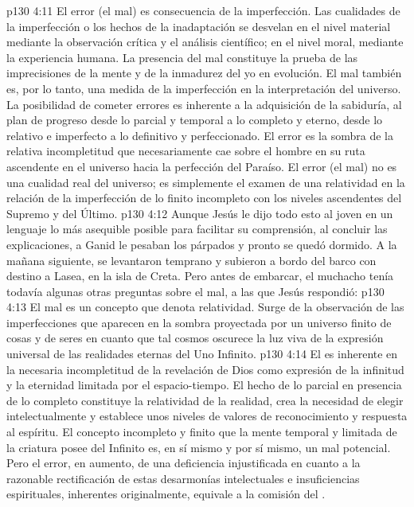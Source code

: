 \vs p130 4:11 El error (el mal) es consecuencia de la imperfección. Las cualidades de la imperfección o los hechos de la inadaptación se desvelan en el nivel material mediante la observación crítica y el análisis científico; en el nivel moral, mediante la experiencia humana. La presencia del mal constituye la prueba de las imprecisiones de la mente y de la inmadurez del yo en evolución. El mal también es, por lo tanto, una medida de la imperfección en la interpretación del universo. La posibilidad de cometer errores es inherente a la adquisición de la sabiduría, al plan de progreso desde lo parcial y temporal a lo completo y eterno, desde lo relativo e imperfecto a lo definitivo y perfeccionado. El error es la sombra de la relativa incompletitud que necesariamente cae sobre el hombre en su ruta ascendente en el universo hacia la perfección del Paraíso. El error (el mal) no es una cualidad real del universo; es simplemente el examen de una relatividad en la relación de la imperfección de lo finito incompleto con los niveles ascendentes del Supremo y del Último.
\vs p130 4:12 \pc Aunque Jesús le dijo todo esto al joven en un lenguaje lo más asequible posible para facilitar su comprensión, al concluir las explicaciones, a Ganid le pesaban los párpados y pronto se quedó dormido. A la mañana siguiente, se levantaron temprano y subieron a bordo del barco con destino a Lasea, en la isla de Creta. Pero antes de embarcar, el muchacho tenía todavía algunas otras preguntas sobre el mal, a las que Jesús respondió:
\vs p130 4:13 \pc El mal es un concepto que denota relatividad. Surge de la observación de las imperfecciones que aparecen en la sombra proyectada por un universo finito de cosas y de seres en cuanto que tal cosmos oscurece la luz viva de la expresión universal de las realidades eternas del Uno Infinito.
\vs p130 4:14 El  es inherente en la necesaria incompletitud de la revelación de Dios como expresión de la infinitud y la eternidad limitada por el espacio\hyp{}tiempo. El hecho de lo parcial en presencia de lo completo constituye la relatividad de la realidad, crea la necesidad de elegir intelectualmente y establece unos niveles de valores de reconocimiento y respuesta al espíritu. El concepto incompleto y finito que la mente temporal y limitada de la criatura posee del Infinito es, en sí mismo y por sí mismo, un mal potencial. Pero el error, en aumento, de una deficiencia injustificada en cuanto a la razonable rectificación de estas desarmonías intelectuales e insuficiencias espirituales, inherentes originalmente, equivale a la comisión del .
